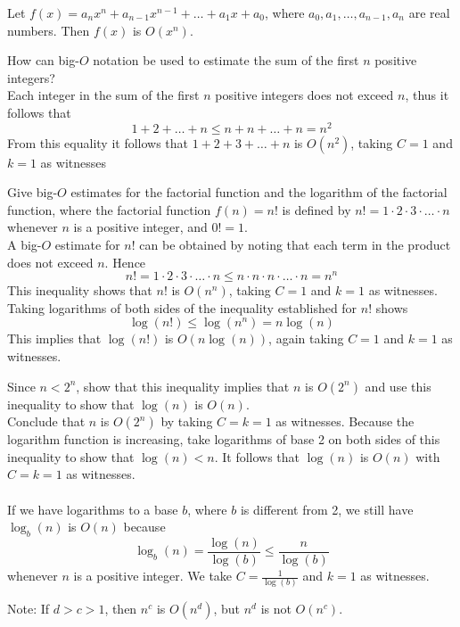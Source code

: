 \documentclass[12pt]{article}
\begin{document}
\begin{theorem} Let $f(x) = a_nx^n + a_{n - 1}x^{n - 1} + \dots + a_1x + a_0$, where $a_0, a_1, \dots, a_{n - 1}, a_n$ are real numbers. Then $f(x)$ is $O(x^n)$. \end{theorem} 
\begin{example} How can big-$O$ notation be used to estimate the sum of the first $n$ positive integers? \\ 
Each integer in the sum of the first $n$ positive integers does not exceed $n$, thus it follows that $$1 + 2 + \dots + n \leq n + n + \dots + n = n^2$$
From this equality it follows that $1+ 2 + 3 + \dots + n$ is $O(n^2)$, taking $C = 1$ and $k = 1$ as witnesses \end{example} 
\begin{example} Give big-$O$ estimates for the factorial function and the logarithm of the factorial function, where the factorial function $f(n) = n!$ is defined by $n! = 1 \cdot 2 \cdot 3 \cdot \dots \cdot n$ whenever $n$ is a positive integer, and $0! = 1$. \\ A big-$O$ estimate for $n!$ can be obtained by noting that each term in the product does not exceed $n$. Hence $$ n! = 1 \cdot 2 \cdot 3 \cdot \dots \cdot n \leq n \cdot n \cdot n \cdot \dots \cdot n = n^n$$ This inequality shows that $n!$ is $O(n^n)$, taking $C = 1$ and $k = 1$ as witnesses. Taking logarithms of both sides of the inequality established for $n!$ shows $$ \log(n!) \leq \log(n^n) = n\log(n)$$ This implies that $\log(n!)$ is $O(n\log(n))$, again taking $C = 1$ and $k = 1$ as witnesses. \end{example}
\begin{example} Since $n < 2^n$, show that this inequality implies that $n$ is $O(2^n)$ and use this inequality to show that $\log(n)$ is $O(n)$. \\ 
Conclude that $n$ is $O(2^n)$ by taking $C = k = 1$ as witnesses. Because the logarithm function is increasing, take logarithms of base 2 on both sides of this inequality to show that $\log(n) < n$. It follows that $\log(n)$ is $O(n)$ with $C = k = 1$ as witnesses. \\~\\ If we have logarithms to a base $b$, where $b$ is different from 2, we still have $\log_b(n)$ is $O(n)$ because $$\log_b(n) = \frac{\log(n)}{\log(b)} \leq \frac{n}{\log(b)} $$ whenever $n$ is a positive integer. We take $C = \frac{1}{\log(b)}$ and $ k = 1$ as witnesses. \end{example} 
Note: If $d > c > 1$, then $n^c$ is $O(n^d)$, but $n^d$ is not $O(n^c)$. \\~\\ 
\end{document}
